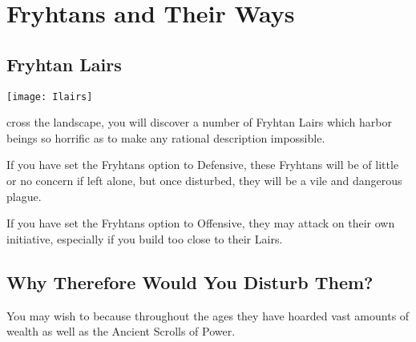 
\chapter{Fryhtans and Their Ways}

\section{Fryhtan Lairs}


\begin{center}
	\texttt{[image: Ilairs]} %
\end{center}

cross the landscape, you will discover a number of Fryhtan Lairs which harbor beings so horrific as to make any rational description impossible.

If you have set the Fryhtans option to Defensive, these Fryhtans will be of little or no concern if left alone, but once disturbed, they will be a vile and dangerous plague.

If you have set the Fryhtans option to Offensive, they may attack on their own initiative, especially if you build too close to their Lairs.

\section{Why Therefore Would You Disturb Them?}


You may wish to because throughout the ages they have hoarded vast amounts of wealth as well as the Ancient Scrolls of Power.

